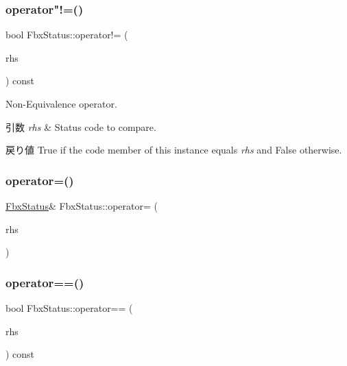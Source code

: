 \subsubsection{\texorpdfstring{operator"!=()}{operator!=()}\hspace{0.1cm}{\footnotesize\ttfamily [2/2]}}
{\footnotesize\ttfamily bool Fbx\+Status\+::operator!= (\begin{DoxyParamCaption}\item[{const \hyperlink{class_fbx_status_a6a631d5d95b28e31a19aabd5f5809ecc}{E\+Status\+Code}}]{rhs }\end{DoxyParamCaption}) const}

Non-\/\+Equivalence operator. 
\begin{DoxyParams}{引数}
{\em rhs} & Status code to compare. \\
\hline
\end{DoxyParams}
\begin{DoxyReturn}{戻り値}
{\ttfamily True} if the code member of this instance equals {\itshape rhs} and {\ttfamily False} otherwise. 
\end{DoxyReturn}
\mbox{\label{class_fbx_status_a014bcc7b3ccd713f98f87d9eac77b579}} 
\subsubsection{\texorpdfstring{operator=()}{operator=()}}
{\footnotesize\ttfamily \hyperlink{class_fbx_status}{Fbx\+Status}\& Fbx\+Status\+::operator= (\begin{DoxyParamCaption}\item[{const \hyperlink{class_fbx_status}{Fbx\+Status} \&}]{rhs }\end{DoxyParamCaption})}

\mbox{\label{class_fbx_status_a7dfb7606bdb3fb0df2cceb9edc01c4df}} 
\subsubsection{\texorpdfstring{operator==()}{operator==()}\hspace{0.1cm}{\footnotesize\ttfamily [1/2]}}
{\footnotesize\ttfamily bool Fbx\+Status\+::operator== (\begin{DoxyParamCaption}\item[{const \hyperlink{class_fbx_status}{Fbx\+Status} \&}]{rhs }\end{DoxyParamCaption}) const}

